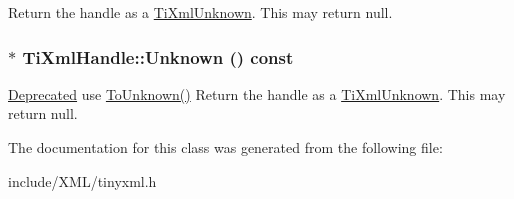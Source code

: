 \label{class_ti_xml_handle_a1381c17507a130767b1e23afc93b3674}
Return the handle as a \hyperlink{class_ti_xml_unknown}{TiXmlUnknown}. This may return null. \hypertarget{class_ti_xml_handle_a49675b74357ba2aae124657a9a1ef465}{
\subsubsection[{Unknown}]{$\ast$ TiXmlHandle::Unknown () const}}
\label{class_ti_xml_handle_a49675b74357ba2aae124657a9a1ef465}
\begin{Desc}
\item[\hyperlink{deprecated__deprecated000004}{Deprecated}]use \hyperlink{class_ti_xml_handle_a1381c17507a130767b1e23afc93b3674}{ToUnknown()} Return the handle as a \hyperlink{class_ti_xml_unknown}{TiXmlUnknown}. This may return null. \end{Desc}


The documentation for this class was generated from the following file:\begin{DoxyCompactItemize}
\item 
include/XML/tinyxml.h\end{DoxyCompactItemize}
